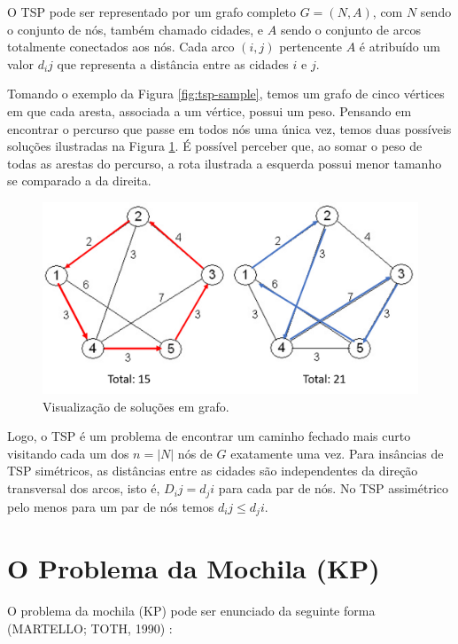 O TSP pode ser representado por um grafo completo $G = (N, A)$, com $N$ sendo o conjunto de nós, também chamado cidades, e $A$ sendo o conjunto de arcos totalmente conectados aos nós. Cada arco $(i, j)$ pertencente $A$ é atribuído um valor $d_ij$ que representa a distância entre as cidades $i$ e $j$.

Tomando o exemplo da Figura \ref{fig:tsp-sample}, temos um grafo de cinco vértices em que cada aresta, associada a um vértice, possui um peso. Pensando em encontrar o percurso que passe em todos nós uma única vez, temos duas possíveis soluções ilustradas na Figura \ref{fig:tsp-exemplo}. É possível perceber que, ao somar o peso de todas as arestas do percurso, a rota ilustrada a esquerda possui menor tamanho se comparado a da direita. 

\begin{figure}[h]
	\caption{\label{fig:tsp-exemplo}Visualização de soluções em grafo.}
	\begin{center}
	    \includegraphics[scale=0.5]{imagens/grafos.png}
	\end{center}
\end{figure}

Logo, o TSP é um problema de encontrar um caminho fechado mais curto visitando cada um dos $n = |N|$ nós de $G$ exatamente uma vez. Para insâncias de TSP simétricos, as distâncias entre as cidades são independentes da direção transversal dos arcos, isto é, $D_ij = d_ji$ para cada par de nós. No TSP assimétrico pelo menos para um par de nós temos $d_ij \leq d_ji$.

\section{O Problema da Mochila (KP)}
\label{sec-kp}

O problema da mochila (KP) pode ser enunciado da seguinte forma (MARTELLO; TOTH, 1990) \cite{Martello:1990:KPA:98124}:

